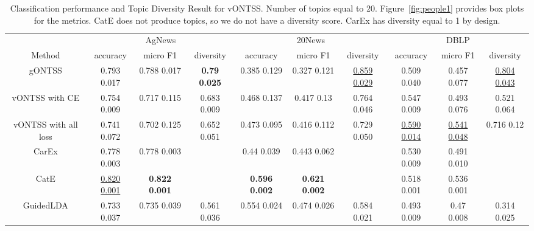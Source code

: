 \documentclass[11pt]{article}
\begin{document}
\begin{table*}
\centering

\caption{\label{tab:people1}Classification performance and Topic Diversity Result for vONTSS. Number of topics equal to 20. Figure~\ref{fig:people1} provides box plots for the metrics. CatE does not produce topics, so we do not have a diversity score. CarEx has diversity equal to 1 by design.}
\vskip 0.15in
\scalebox{0.63} {
\centering
\begin{tabular}{| c| c c c| c c c| c c c |} 
\hline
\multicolumn{1}{c}{} \vline &
\multicolumn{3}{c}{AgNews}\vline  & \multicolumn{3}{c}{20News} \vline & \multicolumn{3}{c}{DBLP}\vline\\
\multicolumn{1}{c}{Method} \vline &
\multicolumn{1}{c}{accuracy} & \multicolumn{1}{c}{micro F1} & \multicolumn{1}{c}{diversity} \vline
& \multicolumn{1}{c}{accuracy} & \multicolumn{1}{c}{micro F1} & \multicolumn{1}{c}{diversity} \vline
& \multicolumn{1}{c}{accuracy} & \multicolumn{1}{c}{micro F1} & \multicolumn{1}{c}{diversity} \vline\\
\hline
\multicolumn{1}{c}{gONTSS} \vline & 0.793  0.017 & 0.788  0.017 & \textbf{0.79  0.025}  & 0.385  0.129 & 0.327  0.121 & \underline{0.859  0.029} & 0.509  0.040 & 0.457  0.077 & \underline{0.804  0.043} \\



\multicolumn{1}{c}{vONTSS with CE} \vline  & 0.754  0.009 & 0.717  0.115 & 0.683  0.009 &  0.468  0.137 & 0.417  0.13  & 0.764  0.046 &  0.547  0.009 & 0.493  0.076 & 0.521  0.064 \\



\multicolumn{1}{c}{vONTSS with all loss} \vline & 0.741  0.072 & 0.702  0.125 & 0.652  0.051 & 0.473  0.095 & 0.416  0.112 & 0.729  0.050 & \underline{0.590  0.014} & \underline{0.541  0.048}  & 0.716  0.12 \\


\multicolumn{1}{c}{CarEx} \vline & 0.778  0.003 & 0.778  0.003 &     & 0.44  0.039  & 0.443  0.062 &        & 0.530  0.009 & 0.491  0.010 &        \\




\multicolumn{1}{c}{CatE} \vline & \underline{0.820  0.001} & \textbf{0.822  0.001} &  & \textbf{0.596  0.002} & \textbf{0.621  0.002} & &  0.518  0.001 & 0.536  0.001 &               \\


\multicolumn{1}{c}{GuidedLDA} \vline & 0.733  0.037 & 0.735 0.039 & 0.561  0.036 & 0.554  0.024 & 0.474  0.026 & 0.584  0.021 & 0.493  0.009 & 0.47  0.008  & 0.314  0.025\\


\end{tabular}}
\end{table*}
\end{document}
